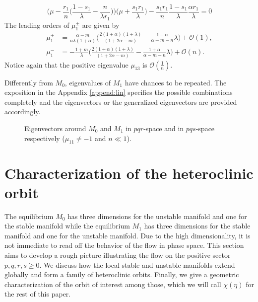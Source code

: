 \documentclass[a4paper,11pt]{article}
\def\BO{{\mathcal{O}}}
\theoremstyle{remark}
\begin{document}
\begin{itemize}
 $$ \Big(\mu - \frac{r_1}{n}\Big(\frac{1-s_1}{\lambda}-\frac{n}{\lambda r_1}\Big)\Big)\Big(\mu + \frac{s_1r_1}{\lambda}\Big) - \frac{s_1r_1}{n} \frac{1-s_1}{\lambda}\frac{\alpha r_1}{\lambda} = 0$$
The leading orders of $\mu_1^\pm$ are given by
\begin{align*}
\mu_1^+ &= \frac{\alpha-m}{n\lambda(1+\alpha)}\Big(\frac{2(1+\alpha)(1+\lambda)}{(1+2\alpha-m) } - \frac{1+\alpha}{\alpha-m-n}\lambda\Big) + \BO(1), \\
\mu_1^- &= -\frac{1+m}{\lambda}\Big(\frac{2(1+\alpha)(1+\lambda)}{(1+2\alpha-m) } - \frac{1+\alpha}{\alpha-m-n}\lambda\Big) + \BO(n).
\end{align*}
Notice again that the positive eigenvalue $\mu_{13}$ is $\mathcal{O}( \frac{1}{n})$.

Differently from $M_0$, eigenvalues of $M_1$ have chances to be repeated. The exposition in the Appendix \ref{append:lin} specifies the possible combinations completely and the eigenvectors or the generalized eigenvectors are provided accordingly.
\end{itemize}
\begin{figure}
 \centering
  \subfigure[$pqr$-space]{
  \psfrag{r}{\scriptsize$r$}%
  \texttt{[image: equilibriapqr.eps]}\label{fig:eq1}
  }
  \quad \quad
  \subfigure[$pqs$-space]{
  \psfrag{r}{\scriptsize$s-\frac{1+m}{1+\alpha}$}%
  \texttt{[image: equilibriapqs.eps]}\label{fig:eq2}
  }
  \caption{Eigenvectors around $M_0$ and $M_1$ in $pqr$-space and in $pqs$-space respectively ($\mu_{11}\ne-1$ and $n\ll1$). } \label{fig:equilibria}
\end{figure}

\section{Characterization of the heteroclinic orbit} \label{sec:char}
The equilibrium $M_0$ has three dimensions for the unstable manifold and one for the stable manifold while the equilibrium $M_1$ has three dimensions for the 
stable manifold and one for the unstable manifold. Due to the high dimensionality, it is not immediate to read off the behavior 
of the flow in phase space. This section aims to develop a rough picture illustrating the flow on the positive sector $p,q,r,s \ge0$. 
We discuss how the local stable and unstable manifolds extend globally and form a family of heteroclinic orbits. 
Finally, we give a geometric characterization of the orbit of interest among those, which we will call $\chi(\eta)$ for the rest of this paper.
\end{document}
